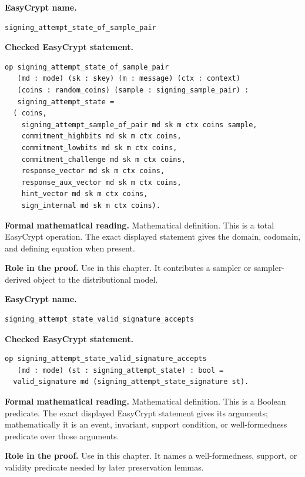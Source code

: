 \begin{formaldefinition}
\noindent\textbf{EasyCrypt name.}
\begin{lstlisting}[language=EasyCrypt,basicstyle=\ttfamily\scriptsize]
signing_attempt_state_of_sample_pair
\end{lstlisting}
\noindent\textbf{Checked EasyCrypt statement.}
\begin{lstlisting}[language=EasyCrypt,basicstyle=\ttfamily\scriptsize]
op signing_attempt_state_of_sample_pair
   (md : mode) (sk : skey) (m : message) (ctx : context)
   (coins : random_coins) (sample : signing_sample_pair) :
   signing_attempt_state =
  ( coins,
    signing_attempt_sample_of_pair md sk m ctx coins sample,
    commitment_highbits md sk m ctx coins,
    commitment_lowbits md sk m ctx coins,
    commitment_challenge md sk m ctx coins,
    response_vector md sk m ctx coins,
    response_aux_vector md sk m ctx coins,
    hint_vector md sk m ctx coins,
    sign_internal md sk m ctx coins).
\end{lstlisting}
\noindent\textbf{Formal mathematical reading.}
Mathematical definition. This is a total EasyCrypt operation.  The exact displayed statement gives the domain, codomain, and defining equation when present.

\noindent\textbf{Role in the proof.}
Use in this chapter. It contributes a sampler or sampler-derived object to the distributional model.

\end{formaldefinition}

\begin{formaldefinition}
\noindent\textbf{EasyCrypt name.}
\begin{lstlisting}[language=EasyCrypt,basicstyle=\ttfamily\scriptsize]
signing_attempt_state_valid_signature_accepts
\end{lstlisting}
\noindent\textbf{Checked EasyCrypt statement.}
\begin{lstlisting}[language=EasyCrypt,basicstyle=\ttfamily\scriptsize]
op signing_attempt_state_valid_signature_accepts
   (md : mode) (st : signing_attempt_state) : bool =
  valid_signature md (signing_attempt_state_signature st).
\end{lstlisting}
\noindent\textbf{Formal mathematical reading.}
Mathematical definition. This is a Boolean predicate.  The exact displayed EasyCrypt statement gives its arguments; mathematically it is an event, invariant, support condition, or well-formedness predicate over those arguments.

\noindent\textbf{Role in the proof.}
Use in this chapter. It names a well-formedness, support, or validity predicate needed by later preservation lemmas.

\end{formaldefinition}

